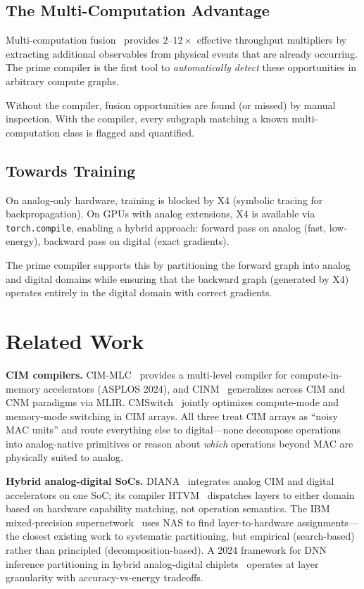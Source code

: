 \documentclass[11pt]{article}
\begin{document}
\subsection{The Multi-Computation Advantage}

Multi-computation fusion~\cite{bieg2026} provides $2$--$12\times$ effective throughput multipliers by extracting additional observables from physical events that are already occurring. The prime compiler is the first tool to \textit{automatically detect} these opportunities in arbitrary compute graphs.

Without the compiler, fusion opportunities are found (or missed) by manual inspection. With the compiler, every subgraph matching a known multi-computation class is flagged and quantified.

\subsection{Towards Training}

On analog-only hardware, training is blocked by X4 (symbolic tracing for backpropagation). On GPUs with analog extensions, X4 is available via \texttt{torch.compile}, enabling a hybrid approach: forward pass on analog (fast, low-energy), backward pass on digital (exact gradients).

The prime compiler supports this by partitioning the forward graph into analog and digital domains while ensuring that the backward graph (generated by X4) operates entirely in the digital domain with correct gradients.

\section{Related Work}
\label{sec:related}

\textbf{CIM compilers.} CIM-MLC~\cite{cimmlc2024} provides a multi-level compiler for compute-in-memory accelerators (ASPLOS 2024), and CINM~\cite{cinm2024} generalizes across CIM and CNM paradigms via MLIR. CMSwitch~\cite{cmswitch2025} jointly optimizes compute-mode and memory-mode switching in CIM arrays. All three treat CIM arrays as ``noisy MAC units'' and route everything else to digital---none decompose operations into analog-native primitives or reason about \textit{which} operations beyond MAC are physically suited to analog.

\textbf{Hybrid analog-digital SoCs.} DIANA~\cite{diana2022} integrates analog CIM and digital accelerators on one SoC; its compiler HTVM~\cite{htvm2023} dispatches layers to either domain based on hardware capability matching, not operation semantics. The IBM mixed-precision supernetwork~\cite{ibm_supernetwork2026} uses NAS to find layer-to-hardware assignments---the closest existing work to systematic partitioning, but empirical (search-based) rather than principled (decomposition-based). A 2024 framework for DNN inference partitioning in hybrid analog-digital chiplets~\cite{hybrid_partition2024} operates at layer granularity with accuracy-vs-energy tradeoffs.
\end{document}
